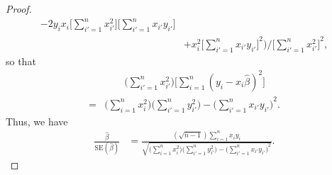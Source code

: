 \begin{itemize}
\begin{proof}
\begin{equation*}
\begin{split}
                        - 2y_ix_i \Biggl[\sum_{i'=1}^n x_{i'}^2\Biggr]
                        \Biggl[\sum_{i'=1}^n x_{i'}y_{i'}\Biggr] \\ 
                    &+ x_i^2 {\Biggl[\sum_{i'=1}^n x_{i'}y_{i'}\Biggr]}^2 \Biggr) / 
                        {\Biggl[\sum_{i'=1}^n x_{i'}^2\Biggr]}^2,
                \end{split}
            \end{equation*}
            so that
            \begin{equation*}
                \begin{split}
                    &\qquad \Biggl(\sum_{i'=1}^n x_{i'}^2\Biggr)
                    \Biggl[\sum_{i=1}^n {(y_i - x_i\hat{\beta})}^2\Biggr] \\
                    = &\Biggl(\sum_{i=1}^n x_i^2\Biggr)
                    \Biggl(\sum_{i'=1}^n y_{i'}^2 \Biggr)
                    - {\Biggl(\sum_{i'=1}^n x_{i'}y_{i'}\Biggr)}^2.
                \end{split}
            \end{equation*}
            Thus, we have
            \begin{equation*}
                \begin{split}
                    \frac{\hat{\beta}}{\text{SE}(\hat{\beta})}
                    &= \frac{(\sqrt{n - 1})\sum_{i=1}^n x_i y_i}
                        {
                            \sqrt{\bigl(\sum_{i=1}^n x_i^2\bigr)
                            \bigl(\sum_{i'=1}^n y_{i'}^2\bigr)
                            - {\bigl(\sum_{i'=1}^n x_{i'}y_{i'}\bigr)}^2}
                        }.
                \end{split}
            \end{equation*}
        \end{proof}
\end{itemize}
